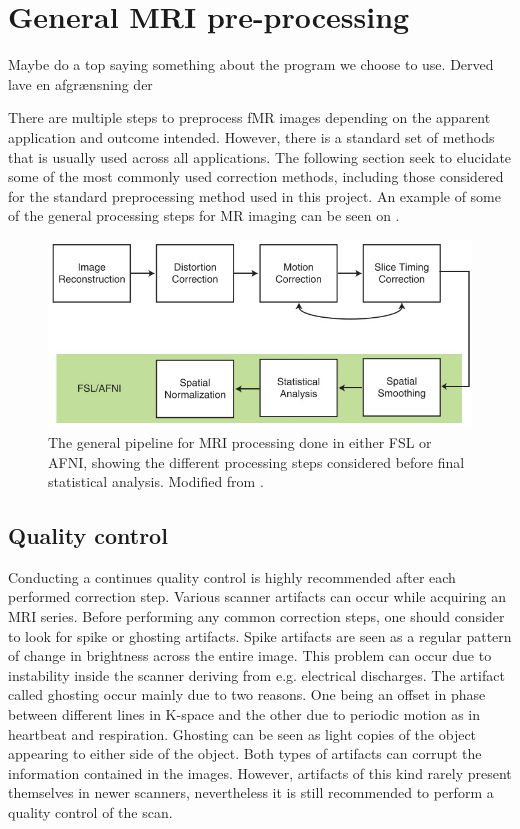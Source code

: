 

\section{General MRI pre-processing}
Maybe do a top saying something about the program we choose to use. Derved lave en afgrænsning der 


There are multiple steps to preprocess fMR images depending on the apparent application and outcome intended. However, there is a standard set of methods that is usually used across all applications. The following section seek to elucidate some of the most commonly used correction methods, including those considered for the standard preprocessing method used in this project. An example of some of the general processing steps for MR imaging can be seen on .\cite{Poldrack2011} 

\begin{figure}[H]                 
	\includegraphics[width=.8\textwidth]{figures/aBackground/processing}  
	\caption{The general pipeline for MRI processing done in either FSL or AFNI, showing the different processing steps considered before final statistical analysis. Modified from \cite{Poldrack2011}.}
	\label{fig:back:pipeline} 
\end{figure}


\subsection{Quality control}
Conducting a continues quality control is highly recommended after each performed correction step. Various scanner artifacts can occur while acquiring an MRI series. Before performing any common correction steps, one should consider to look for spike or ghosting artifacts. Spike artifacts are seen as a regular pattern of change in brightness across the entire image. This problem can occur due to instability inside the scanner deriving from e.g. electrical discharges.  
The artifact called ghosting occur mainly due to two reasons. One being an offset in phase between different lines in K-space and the other due to periodic motion as in heartbeat and respiration. Ghosting can be seen as light copies of the object appearing to either side of the object. Both types of artifacts can corrupt the information contained in the images. However, artifacts of this kind rarely present themselves in newer scanners, nevertheless it is still recommended to perform a quality control of the scan.\cite{Poldrack2011}

